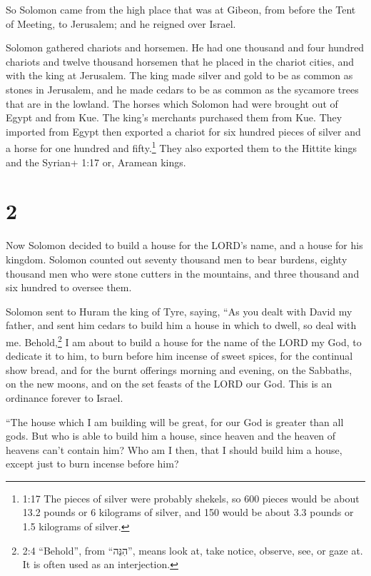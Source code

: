  So Solomon came from the high place that was at Gibeon,
from before the Tent of Meeting, to Jerusalem; and he reigned over
Israel.

 Solomon gathered chariots and horsemen. He had one
thousand and four hundred chariots and twelve thousand horsemen that he
placed in the chariot cities, and with the king at Jerusalem.
 The king made silver and gold to be as common as stones in
Jerusalem, and he made cedars to be as common as the sycamore trees that
are in the lowland.  The horses which Solomon had were
brought out of Egypt and from Kue. The king's merchants purchased them
from Kue.  They imported from Egypt then exported a chariot
for six hundred pieces of silver and a horse for one hundred and
fifty.\footnote{1:17 The pieces of silver were probably shekels, so 600
  pieces would be about 13.2 pounds or 6 kilograms of silver, and 150
  would be about 3.3 pounds or 1.5 kilograms of silver.} They also
exported them to the Hittite kings and the Syrian+ 1:17 or, Aramean
kings.

\hypertarget{section-1}{%
\section{2}\label{section-1}}

 Now Solomon decided to build a house for the LORD's name,
and a house for his kingdom.  Solomon counted out seventy
thousand men to bear burdens, eighty thousand men who were stone cutters
in the mountains, and three thousand and six hundred to oversee them.

 Solomon sent to Huram the king of Tyre, saying, ``As you
dealt with David my father, and sent him cedars to build him a house in
which to dwell, so deal with me.  Behold,\footnote{2:4
  ``Behold'', from ``הִנֵּה'', means look at, take notice, observe, see,
  or gaze at. It is often used as an interjection.} I am about to build
a house for the name of the LORD my God, to dedicate it to him, to burn
before him incense of sweet spices, for the continual show bread, and
for the burnt offerings morning and evening, on the Sabbaths, on the new
moons, and on the set feasts of the LORD our God. This is an ordinance
forever to Israel.

 ``The house which I am building will be great, for our God
is greater than all gods.  But who is able to build him a
house, since heaven and the heaven of heavens can't contain him? Who am
I then, that I should build him a house, except just to burn incense
before him?

